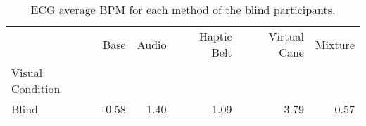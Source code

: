 
\begin{table}[!htb]
\centering
\caption{ECG average BPM  for each method of the blind participants.}
\label{tab:bpm_average_group_blind}
\begin{tabular}{lrrrrr}
\toprule
{} &   Base & Audio & Haptic Belt & Virtual Cane & Mixture \\
Visual Condition &        &       &             &              &         \\
\midrule
Blind            &  -0.58 &  1.40 &        1.09 &         3.79 &    0.57 \\
\bottomrule
\end{tabular}
\end{table}

